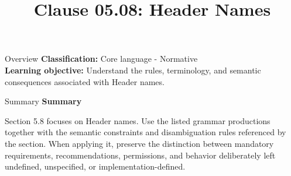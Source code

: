 \documentclass[10pt,letterpaper]{article}
\title{Clause 05.08: Header Names}
\author{}
\date{}
\begin{document}
\maketitle
\begin{CornellOverviewBox}{Overview}
\textbf{Classification:} Core language - Normative\\[2pt]
\textbf{Learning objective:} Understand the rules, terminology, and semantic consequences associated with Header names.
\end{CornellOverviewBox}\begin{CornellSummaryBox}{Summary}
{\sffamily\bfseries\color{Accent} Summary}\par\vspace{3pt}Section 5.8 focuses on Header names. Use the listed grammar productions together with the semantic constraints and disambiguation rules referenced by the section. When applying it, preserve the distinction between mandatory requirements, recommendations, permissions, and behavior deliberately left undefined, unspecified, or implementation-defined.
\end{CornellSummaryBox}
\end{document}

